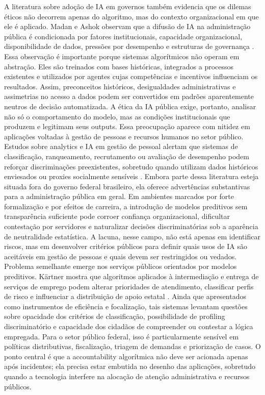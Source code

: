 \documentclass[12pt,a4paper]{article}
\begin{document}
A literatura sobre adoção de IA em governos também evidencia que os dilemas éticos não decorrem apenas do algoritmo, mas do contexto organizacional em que ele é aplicado. Madan e Ashok observam que a difusão de IA na administração pública é condicionada por fatores institucionais, capacidade organizacional, disponibilidade de dados, pressões por desempenho e estruturas de governança \autocite{madan2022ai}. Essa observação é importante porque sistemas algorítmicos não operam em abstração. Eles são treinados com bases históricas, integrados a processos existentes e utilizados por agentes cujas competências e incentivos influenciam os resultados. Assim, preconceitos históricos, desigualdades administrativas e assimetrias no acesso a dados podem ser convertidos em padrões aparentemente neutros de decisão automatizada. A ética da IA pública exige, portanto, analisar não só o comportamento do modelo, mas as condições institucionais que produzem e legitimam seus outputs.
Essa preocupação aparece com nitidez em aplicações voltadas à gestão de pessoas e recursos humanos no setor público. Estudos sobre analytics e IA em gestão de pessoal alertam que sistemas de classificação, ranqueamento, recrutamento ou avaliação de desempenho podem reforçar discriminações preexistentes, sobretudo quando utilizam dados históricos enviesados ou proxies socialmente sensíveis \autocite{cho2023human} \autocite{chilunjika2022artificial} \autocite{barros2025inteligencia}. Embora parte dessa literatura esteja situada fora do governo federal brasileiro, ela oferece advertências substantivas para a administração pública em geral. Em ambientes marcados por forte formalização e por efeitos de carreira, a introdução de modelos preditivos sem transparência suficiente pode corroer confiança organizacional, dificultar contestação por servidores e naturalizar decisões discriminatórias sob a aparência de neutralidade estatística. A lacuna, nesse campo, não está apenas em identificar riscos, mas em desenvolver critérios públicos para definir quais usos de IA são aceitáveis em gestão de pessoas e quais devem ser restringidos ou vedados.
Problema semelhante emerge nos serviços públicos orientados por modelos preditivos. Kärtner mostra que algoritmos aplicados à intermediação e entrega de serviços de emprego podem alterar prioridades de atendimento, classificar perfis de risco e influenciar a distribuição de apoio estatal \autocite{krtner2021predictive}. Ainda que apresentados como instrumentos de eficiência e focalização, tais sistemas levantam questões sobre opacidade dos critérios de classificação, possibilidade de profiling discriminatório e capacidade dos cidadãos de compreender ou contestar a lógica empregada. Para o setor público federal, isso é particularmente sensível em políticas distributivas, fiscalização, triagem de demandas e priorização de casos. O ponto central é que a accountability algorítmica não deve ser acionada apenas após incidentes; ela precisa estar embutida no desenho das aplicações, sobretudo quando a tecnologia interfere na alocação de atenção administrativa e recursos públicos.
\end{document}
